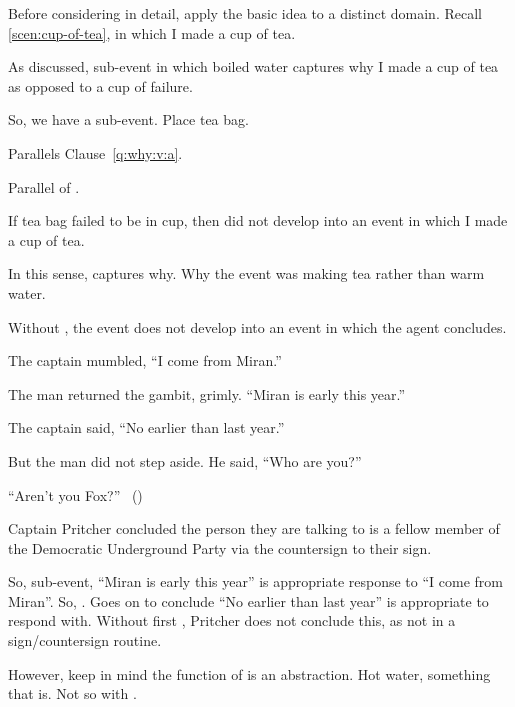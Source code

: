 \begin{note}
  Before considering \qWhyV{} in detail, apply the basic idea to a distinct domain.
  Recall \autoref{scen:cup-of-tea}, in which I made a cup of tea.

  As discussed, sub-event in which boiled water captures why I made a cup of tea as opposed to a cup of failure.

  So, we have a sub-event.
  Place tea bag.

  Parallels Clause~\autoref{q:why:v:a}.

  Parallel of \itc{}.

  If tea bag failed to be in cup, then did not develop into an event in which I made a cup of tea.

  In this sense, captures why.
  Why the event was making tea rather than warm water.



\end{note}

\begin{note}
  Without \ros{}, the event does not develop into an event in which the agent concludes.

  \begin{scenario}[Countersign]
    The captain mumbled, ``I come from Miran.''

    The man returned the gambit, grimly.
    ``Miran is early this year.''

    The captain said, ``No earlier than last year.''

    But the man did not step aside.
    He said, ``Who are you?''

    ``Aren't you Fox?''%
    \mbox{ }\hfill\mbox{(\cite[70]{Asimov:1945aa})}
  \end{scenario}

  Captain Pritcher concluded the person they are talking to is a fellow member of the Democratic Underground Party via the countersign to their sign.

  So, sub-event, ``Miran is early this year'' is appropriate response to ``I come from Miran''.
  So, \ros{}.
  Goes on to conclude ``No earlier than last year'' is appropriate to respond with.
  Without first \ros{}, Pritcher does not conclude this, as not in a sign/countersign routine.

  However, keep in mind the function of \ros{} is an abstraction.
  Hot water, something that is.
  Not so with .
\end{note}

